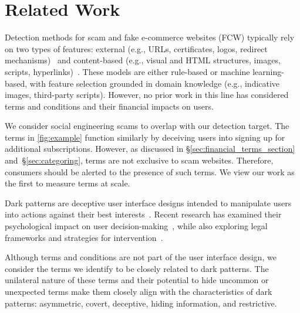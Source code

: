 \section{Related Work}
Detection methods for scam and fake e-commerce websites (FCW) typically rely on two types of features: external (e.g., URLs, certificates, logos, redirect mechanisms)~\citep{blum2010lexical, zouina2017novel, moghimi2016new, sakurai2020discovering, drury2019certified, van2022logomotive, li2018fake, zhang2014you, zheng2017smoke, sahingoz2019machine, bitaab2023beyond} and content-based (e.g., visual and HTML structures, images, scripts, hyperlinks)~\citep{xiang2011cantina+, kharraz2018surveylance, yang2019phishing, jain2017phishing, bitaab2023beyond, yang2023trident}. These models are either rule-based or machine learning-based, with feature selection grounded in domain knowledge (e.g., indicative images, third-party scripts). However, no prior work in this line has considered terms and conditions and their financial impacts on users.


We consider social engineering scams to overlap with our detection target. The \termname terms in \autoref{fig:example} function similarly by deceiving users into signing up for additional subscriptions. However, as discussed in \S\ref{sec:financial_terms_section} and~\S\ref{sec:categoring}, \termname terms are not exclusive to scam websites. Therefore, consumers should be alerted to the presence of such terms. We view our work as the first to measure \termname terms at scale.



Dark patterns are deceptive user interface designs intended to manipulate users into actions against their best interests~\citep{mathur2019dark}. Recent research has examined their psychological impact on user decision-making~\citep{mathur2021makes,nouwens2020dark,waldman2020cognitive,narayanan2020dark}, while also exploring legal frameworks and strategies for intervention~\citep{luguri2021shining,gray2021dark}.

Although terms and conditions are not part of the user interface design, we consider the \termname terms we identify to be closely related to dark patterns. The unilateral nature of these terms and their potential to hide uncommon or unexpected terms make them closely align with the characteristics of dark patterns: asymmetric, covert, deceptive, hiding information, and restrictive.



